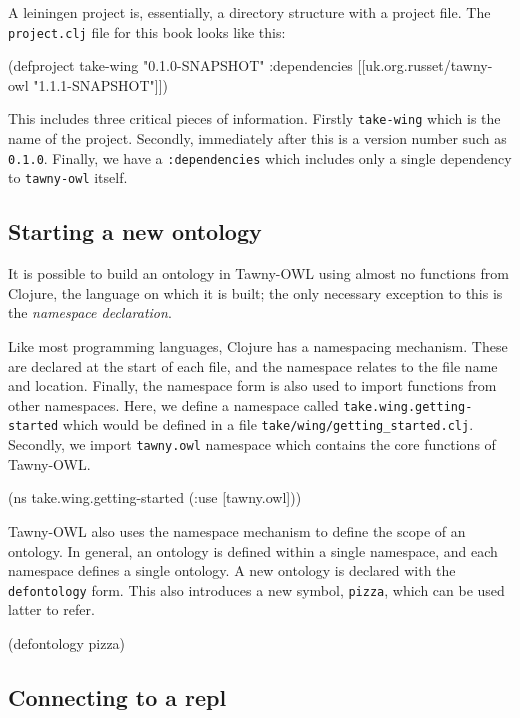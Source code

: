 A leiningen project is, essentially, a directory structure with a
project file. The \texttt{project.clj} file for this book looks like this:

\begin{clojure}
(defproject take-wing "0.1.0-SNAPSHOT"
  :dependencies [[uk.org.russet/tawny-owl "1.1.1-SNAPSHOT"]])
\end{clojure}

This includes three critical pieces of information. Firstly \texttt{take-wing}
which is the name of the project. Secondly, immediately after this is a
version number such as \texttt{0.1.0}. Finally, we have a \texttt{:dependencies} which
includes only a single dependency to \texttt{tawny-owl} itself.


\subsection{Starting a new ontology}
\label{sec-4-2}

It is possible to build an ontology in Tawny-OWL using almost no
functions from Clojure, the language on which it is built; the only
necessary exception to this is the \emph{namespace declaration}.

Like most programming languages, Clojure has a namespacing mechanism.
These are declared at the start of each file, and the namespace relates
to the file name and location. Finally, the namespace form is also used
to import functions from other namespaces. Here, we define a namespace
called \texttt{take.wing.getting-started} which would be defined in a file
\texttt{take/wing/getting\_started.clj}. Secondly, we import \texttt{tawny.owl}
namespace which contains the core functions of Tawny-OWL.

\begin{tawny}
(ns take.wing.getting-started (:use [tawny.owl]))
\end{tawny}

Tawny-OWL also uses the namespace mechanism to define the scope of an
ontology. In general, an ontology is defined within a single namespace,
and each namespace defines a single ontology. A new ontology is declared
with the \texttt{defontology} form. This also introduces a new symbol, \texttt{pizza},
which can be used latter to refer.

\begin{tawny}
(defontology pizza)
\end{tawny}


\subsection{Connecting to a repl}
\label{sec-4-3}

